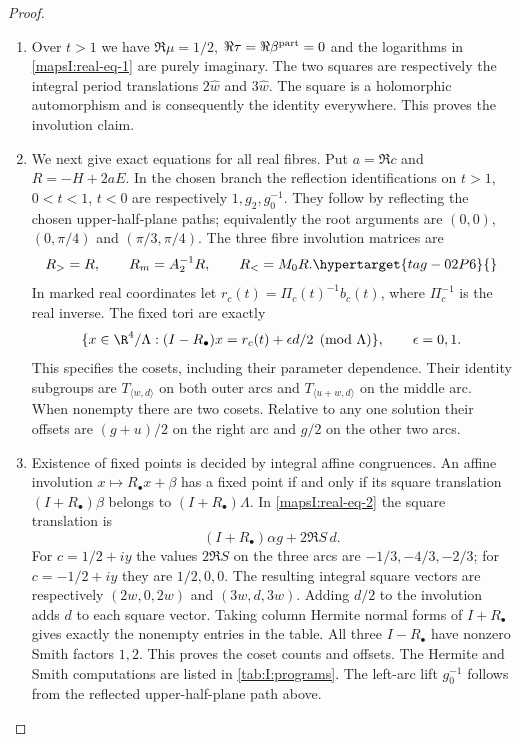 \begin{proof}
\begin{enumerate}[label=\arabic*.,leftmargin=*]
\item Over $t>1$ we have
$\Re\mu=1/2$, $\Re\tau=\Re\beta^{\rm part}=0$ and the logarithms in
\eqref{mapsI:real-eq-1} are purely imaginary. The two squares are respectively the
integral period translations $2\widehat w$ and $3\widehat w$.
The square is a holomorphic automorphism and is consequently the
identity everywhere. This proves the involution claim.

\item We next give exact equations for all real fibres. Put $a=\Re c$ and
$R=-H+2aE$. In the chosen branch the reflection identifications on
$t>1$, $0<t<1$, $t<0$ are respectively $1,g_2,g_0^{-1}$.
They follow by reflecting the chosen upper-half-plane paths; equivalently
the root arguments are $(0,0)$, $(0,\pi/4)$ and $(\pi/3,\pi/4)$.
The three fibre involution matrices are
\begin{equation}
 R_>=R,\qquad R_m=A_2^{-1}R,\qquad R_<=M_0R.
 \hypertarget{tag-02P6}{}\label{mapsI:real-eq-5}
\end{equation}
In marked real coordinates let $r_c(t)=\Pi_c(t)^{-1}b_c(t)$,
where $\Pi_c^{-1}$ is the real inverse. The fixed tori are exactly
\begin{equation}
 \{x\in\R^4/\Lambda:(I-R_\bullet)x=
                       r_c(t)+\epsilon d/2\pmod\Lambda\},
 \qquad\epsilon=0,1.
 \label{mapsI:real-eq-6}
\end{equation}
This specifies the cosets, including their parameter dependence. Their
identity subgroups are $T_{\langle w,d\rangle}$ on both outer arcs and
$T_{\langle u+w,d\rangle}$ on the middle arc. When nonempty there are
two cosets. Relative to any one solution their offsets are
$(g+u)/2$ on the right arc and $g/2$ on the other two arcs.

\item Existence of fixed points is decided by integral affine congruences. An affine involution
$x\mapsto R_\bullet x+\beta$ has a fixed point if and only if its
square translation $(I+R_\bullet)\beta$ belongs to
$(I+R_\bullet)\Lambda$. In \eqref{mapsI:real-eq-2} the square translation is
\[
 (I+R_\bullet)\alpha g+2\Re S\,d.
\]
For $c=1/2+iy$ the values $2\Re S$ on the three arcs are
$-1/3,-4/3,-2/3$; for $c=-1/2+iy$ they are $1/2,0,0$.
The resulting integral square vectors are respectively
$(2w,0,2w)$ and $(3w,d,3w)$. Adding $d/2$ to the involution adds $d$
to each square vector. Taking column Hermite normal forms of
$I+R_\bullet$ gives exactly the nonempty entries in the table.
All three $I-R_\bullet$ have nonzero Smith factors $1,2$.
This proves the coset counts and offsets. The Hermite and Smith
computations are listed in \cref{tab:I:programs}. The left-arc lift
$g_0^{-1}$ follows from the reflected upper-half-plane path above.


\end{enumerate}
\end{proof}
